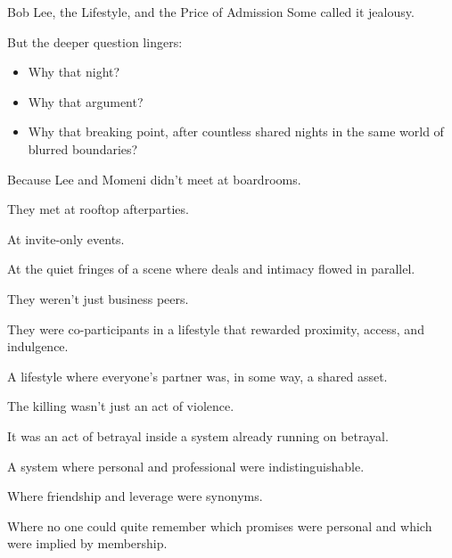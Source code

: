 \begin{HistoricalSidebar}{Bob Lee, the Lifestyle, and the Price of Admission}
  Some called it jealousy.
  
  \medskip
  
  But the deeper question lingers:

  \medskip
  
  \begin{itemize}
    \item Why that night?
    \item Why that argument?
    \item Why that breaking point, after countless shared nights in the same world of blurred boundaries?
  \end{itemize}
  
  \medskip
  
  Because Lee and Momeni didn’t meet at boardrooms.

  \medskip
  
  They met at rooftop afterparties.

  \medskip
  
  At invite-only events.

  \medskip
  
  At the quiet fringes of a scene where deals and intimacy flowed in parallel.

  \medskip
  
  They weren’t just business peers.

  \medskip
  
  They were co-participants in a lifestyle that rewarded proximity, access, and indulgence.

  \medskip
  
  A lifestyle where everyone’s partner was, in some way, a shared asset.
  
  \medskip
  
  The killing wasn’t just an act of violence.

  \medskip
  
  It was an act of betrayal inside a system already running on betrayal.

  \medskip
  
  A system where personal and professional were indistinguishable.

  \medskip
  
  Where friendship and leverage were synonyms.

  \medskip
  
  Where no one could quite remember which promises were personal and which were implied by membership.
  
  \medskip
  

\end{HistoricalSidebar}
